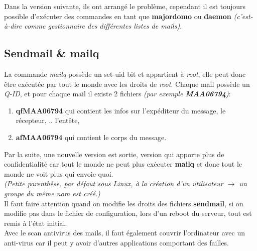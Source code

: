 \documentclass{article}
\newcommand{\titre}[1]{\textcolor{title}{#1}}
\newcommand{\tssect}[1]{\titre{\subsection{#1}}}
\newcommand{\term}[1]{\textit{\textcolor{maintitle}{#1}}}
\begin{document}
\begin{sffamily}
\noindent Dans la version suivante, ils ont arrangé le problème, cependant il est toujours possible d'exécuter des 
commandes en tant que \textbf{majordomo} ou \textbf{daemon} \textit{(c'est-à-dire comme gestionnaire des différentes 
listes de mails)}.

\newpage

\tssect{Sendmail \& mailq}

La commande \term{mailq} possède un set-uid bit et appartient à \textit{root}, elle peut donc être exécutée par tout 
le monde avec les droits de \textit{root}. Chaque mail possède un \term{Q-ID}, et pour chaque mail il existe 2 
fichiers \textit{(par exemple \textbf{MAA06794})}:
\begin{enumerate}
\item \textbf{qfMAA06794} qui contient les infos sur l'expéditeur du message, le récepteur, .. l'entête,
\item \textbf{afMAA06794} qui contient le corps du message.
\end{enumerate}

Par la suite, une nouvelle version est sortie, version qui apporte plus de confidentialité car tout le monde ne peut 
plus exécuter \textbf{mailq} et donc tout le monde ne voit plus qui envoie quoi.\\

\noindent\textit{(Petite parenthèse, par défaut sous Linux, à la création d'un utilisateur $\rightarrow$ un groupe du 
même nom est créé.)} \\

Il faut faire attention quand on modifie les droits des fichiers \textbf{sendmail}, si on modifie pas dans le fichier
de configuration, lors d'un reboot du serveur, tout est remis à l'état initial. \\

Avec le scan antivirus des mails, il faut également couvrir l'ordinateur avec un anti-virus car il peut y avoir 
d'autres applications comportant des failles.

\end{sffamily}
\end{document}
